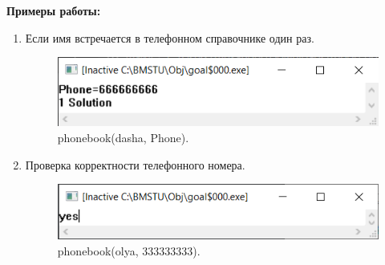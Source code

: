 \textbf{Примеры работы:}
\begin{enumerate}
    \item Если имя встречается в телефонном справочнике один раз.
\begin{figure}[H]
    \centering
    \includegraphics[scale=1.5]{data/image/1.png}
    \caption{phonebook(dasha, Phone).}
\end{figure}

    \item Проверка корректности телефонного номера.
\begin{figure}[H]
    \centering
    \includegraphics[scale=1.5]{data/image/2.png}
    \caption{phonebook(olya, 333333333).}
\end{figure}
\end{enumerate}
